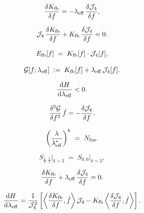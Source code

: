 \begin{equation}
  \frac{\delta K_{\mathrm{fb}}}{\delta f} = -\lambda_{\mathrm{eff}}\,\frac{\delta\mathcal{J}_4}{\delta f},
  \label{P2:eq:BPS}
\end{equation}

\begin{equation}
  \mathcal{J}_4\,\frac{\delta K_{\mathrm{fb}}}{\delta f}
  + K_{\mathrm{fb}}\,\frac{\delta\mathcal{J}_4}{\delta f} = 0.
  \label{P2:eq:EL}
\end{equation}

\begin{equation}
  E_{\mathrm{fb}}[f] \;=\; K_{\mathrm{fb}}[f]\cdot\mathcal{J}_4[f],
  \label{P2:eq:Efb}
\end{equation}

\begin{equation}
  \mathcal{G}[f;\lambda_{\mathrm{eff}}] \;:=\; K_{\mathrm{fb}}[f] + \lambda_{\mathrm{eff}}\,\mathcal{J}_4[f].
  \label{P2:eq:G}
\end{equation}

\begin{equation}
  \frac{\mathrm{d}H}{\mathrm{d}\lambda_{\mathrm{eff}}} < 0.
  \label{P2:eq:Hdecreasing}
\end{equation}

\begin{equation}
  \frac{\delta^2\mathcal{G}}{\delta f^2}\,\dot{f}
  = -\frac{\delta\mathcal{J}_4}{\delta f}.
  \label{P2:eq:IFT}
\end{equation}

\begin{equation}
  \left(\frac{\lambda}{\lambda_{\mathrm{eff}}^*}\right)^k \;=\; N_{\mathrm{fus}}.
  \label{P2:eq:LSC_modular}
\end{equation}

\begin{equation}
  S_{\frac{1}{2},\frac{1}{2}}\big|_{k=3}
  \;=\; S_{0,0}\big|_{k=3},
  \label{P2:eq:Sselfdual}
\end{equation}

\begin{equation}
  \frac{\delta K_{\mathrm{fb}}}{\delta f} + \lambda_{\mathrm{eff}}\,\frac{\delta\mathcal{J}_4}{\delta f} = 0.
  \label{P2:eq:crit}
\end{equation}

\begin{equation}
  \frac{\mathrm{d}H}{\mathrm{d}\lambda_{\mathrm{eff}}}
  = \frac{1}{\mathcal{J}_4^2}
    \left[
      \left\langle \frac{\delta K_{\mathrm{fb}}}{\delta f}, \dot{f}\right\rangle \mathcal{J}_4
      - K_{\mathrm{fb}}\left\langle \frac{\delta\mathcal{J}_4}{\delta f}, \dot{f}\right\rangle
    \right].
  \label{P2:eq:dHdlam}
\end{equation}

